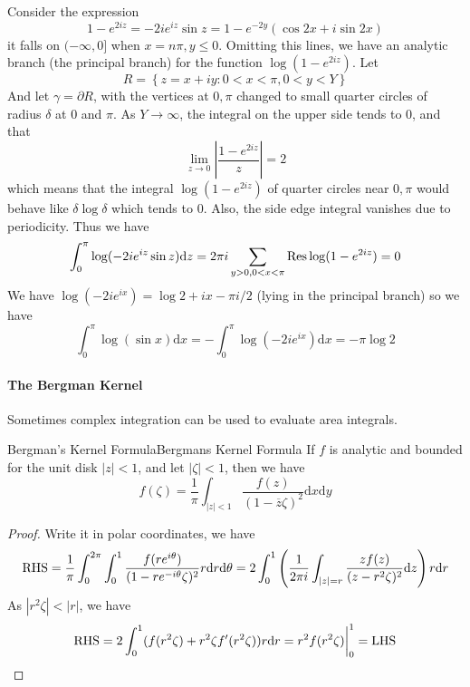 \documentclass[../main.tex]{subfiles}
\begin{document}
Consider the expression
\begin{equation*}
	1-e^{2iz} = -2i e^{iz} \sin z = 1-e^{-2y}(\cos 2x + i \sin 2x)
\end{equation*}
it falls on $(-\infty ,0]$ when $x=n \pi,y\leq 0$. Omitting this lines, we have an analytic branch (the principal branch) for the function $\log (1-e^{2iz})$. Let
\begin{equation*}
	R = \left\{ z=x+iy: 0<x< \pi, 0<y<Y \right\}
\end{equation*}
And let $\gamma = \partial R$, with the vertices at $0, \pi$ changed to small quarter circles of radius $\delta$ at $0$ and $\pi$. As $Y \rightarrow \infty $, the integral on the upper side tends to $0$, and that
\begin{equation*}
	\lim_{z \to 0} \left|\frac{1-e^{2iz}}{z}\right| = 2
\end{equation*}
which means that the integral $\log (1-e^{2iz})$ of quarter circles near $0,\pi$ would behave like $\delta \log \delta$ which tends to $0$. Also, the side edge integral vanishes due to periodicity. Thus we have
\begin{equation}
	\int_0^{\pi} \log (-2i e^{iz} \sin z) \mathrm{d} z = 2 \pi i \sum_{y>0,0<x< \pi} \operatorname{Res} \log (1-e^{2iz})=0
\end{equation}
We have $\log (-2ie^{ix}) = \log 2 + ix- \pi i / 2$ (lying in the principal branch) so we have
\begin{equation}
	\int_0^{\pi} \log (\sin x) \mathrm{d} x = -\int_0^{\pi} \log (-2i e^{ix}) \mathrm{d} x = - \pi \log 2
\end{equation}

\paragraph{The Bergman Kernel}
Sometimes complex integration can be used to evaluate area integrals.
\begin{theorem}{Bergman's Kernel Formula}{Bergmans Kernel Formula}
	If $f$ is analytic and bounded for the unit disk $\left|z\right|<1$, and let $\left|\zeta\right|<1$, then we have
	\begin{equation}
		f(\zeta) = \frac{1}{\pi} \int_{\left|z\right|<1} \frac{f(z)}{(1-\overline{z} \zeta)^2} \mathrm{d} x \mathrm{d} y
	\end{equation}
\end{theorem}
\begin{proof}
Write it in polar coordinates, we have
\begin{equation*}
	\operatorname{RHS} = \frac{1}{\pi} \int_0^{2 \pi} \int_0^1 \frac{f(re^{i \theta})}{(1-re^{-i \theta} \zeta)^2} r \mathrm{d} r \mathrm{d} \theta = 2\int_0^1 \left(\frac{1}{2 \pi i} \int_{\left|z\right|=r} \frac{z f(z)}{(z-r^2\zeta)^2} \mathrm{d} z\right) r \mathrm{d} r
\end{equation*}
As $\left|r^2 \zeta\right| < \left|r\right|$, we have
\begin{equation*}
	\operatorname{RHS} = 2\int_0^1 (f(r^2 \zeta) + r^2 \zeta f'(r^2 \zeta) ) r \mathrm{d} r = r^2 f(r^2 \zeta) \bigg|_0^1 = \operatorname{LHS}
\end{equation*}
\end{proof}
\end{document}
